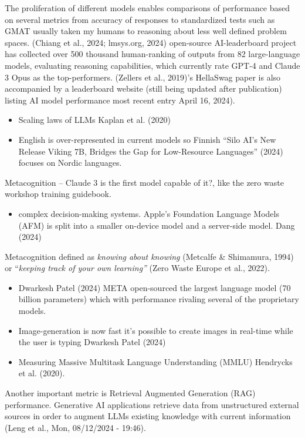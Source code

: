 \documentclass[
  letterpaper,
  DIV=11,
  numbers=noendperiod]{scrartcl}
\providecommand{\tightlist}{%
  \setlength{\itemsep}{0pt}\setlength{\parskip}{0pt}}\usepackage{longtable,booktabs,array}
\begin{document}
The proliferation of different models enables comparisons of performance
based on several metrics from accuracy of responses to standardized
tests such as GMAT usually taken my humans to reasoning about less well
defined problem spaces. (Chiang et al., 2024; lmsys.org, 2024)
open-source AI-leaderboard project has collected over 500 thousand
human-ranking of outputs from 82 large-language models, evaluating
reasoning capabilities, which currently rate GPT-4 and Claude 3 Opus as
the top-performers. (Zellers et al., 2019)'s HellaSwag paper is also
accompanied by a leaderboard website (still being updated after
publication) listing AI model performance most recent entry April 16,
2024).

\begin{itemize}
\item
  Scaling laws of LLMs Kaplan et al. (2020)
\item
  English is over-represented in current models so Finnish {``Silo
  {AI}'s New Release {Viking 7B}, Bridges the Gap for Low-Resource
  Languages''} (2024) focuses on Nordic languages.
\end{itemize}

Metacognition -- Claude 3 is the first model capable of it?, like the
zero waste workshop training guidebook.

\begin{itemize}
\tightlist
\item
  complex decision-making systems. Apple's Foundation Language Models
  (AFM) is split into a smaller on-device model and a server-side model.
  Dang (2024)
\end{itemize}

Metacognition defined as \emph{knowing about knowing} (Metcalfe \&
Shimamura, 1994) or ``\emph{keeping track of your own learning''} (Zero
Waste Europe et al., 2022).

\begin{itemize}
\item
  Dwarkesh Patel (2024) META open-sourced the largest language model (70
  billion parameters) which with performance rivaling several of the
  proprietary models.
\item
  Image-generation is now fast it's possible to create images in
  real-time while the user is typing Dwarkesh Patel (2024)
\item
  Measuring Massive Multitask Language Understanding (MMLU) Hendrycks et
  al. (2020).
\end{itemize}

Another important metric is Retrieval Augmented Generation (RAG)
performance. Generative AI applications retrieve data from unstructured
external sources in order to augment LLMs existing knowledge with
current information (Leng et al., Mon, 08/12/2024 - 19:46).
\end{document}

